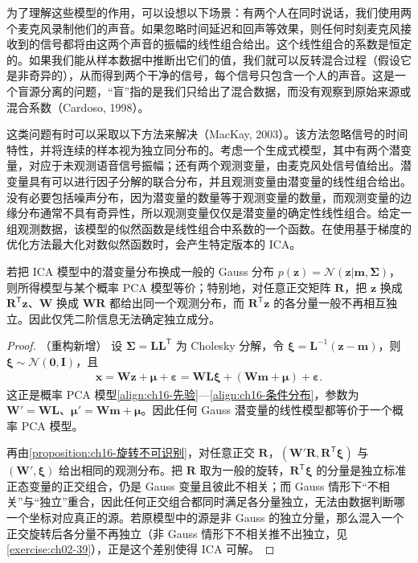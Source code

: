 \documentclass[../../main.tex]{subfiles}
\begin{document}
\begin{example}[ 盲源分离]\label{example:ch16-盲源分离}
为了理解这些模型的作用，可以设想以下场景：有两个人在同时说话，我们使用两个麦克风录制他们的声音。如果忽略时间延迟和回声等效果，则任何时刻麦克风接收到的信号都将由这两个声音的振幅的线性组合给出。这个线性组合的系数是恒定的。如果我们能从样本数据中推断出它们的值，我们就可以反转混合过程（假设它是非奇异的），从而得到两个干净的信号，每个信号只包含一个人的声音。这是一个盲源分离的问题，“盲”指的是我们只给出了混合数据，而没有观察到原始来源或混合系数（Cardoso, 1998）。
\end{example}

这类问题有时可以采取以下方法来解决（MacKay, 2003）。该方法忽略信号的时间特性，并将连续的样本视为独立同分布的。考虑一个生成式模型，其中有两个潜变量，对应于未观测语音信号振幅；还有两个观测变量，由麦克风处信号值给出。潜变量具有可以进行因子分解的联合分布，并且观测变量由潜变量的线性组合给出。没有必要包括噪声分布，因为潜变量的数量等于观测变量的数量，而观测变量的边缘分布通常不具有奇异性，所以观测变量仅仅是潜变量的确定性线性组合。给定一组观测数据，该模型的似然函数是线性组合中系数的一个函数。在使用基于梯度的优化方法最大化对数似然函数时，会产生特定版本的 ICA。

\begin{proposition}\label{proposition:ch16-Gauss不可辨识}
若把 ICA 模型中的潜变量分布换成一般的 Gauss 分布 $p(\bm{z})=\mathcal{N}(\bm{z}|\bm{m},\bm{\Sigma})$，则所得模型与某个概率 PCA 模型等价；特别地，对任意正交矩阵 $\bm{R}$，把 $\bm{z}$ 换成 $\bm{R}^{\mathsf T}\bm{z}$、$\bm{W}$ 换成 $\bm{W}\bm{R}$ 都给出同一个观测分布，而 $\bm{R}^{\mathsf T}\bm{z}$ 的各分量一般不再相互独立。因此仅凭二阶信息无法确定独立成分。
\end{proposition}

\begin{proof}（重构新增）
设 $\bm{\Sigma}=\bm{L}\bm{L}^{\mathsf T}$ 为 Cholesky 分解，令 $\bm{\xi}=\bm{L}^{-1}(\bm{z}-\bm{m})$，则 $\bm{\xi}\sim\mathcal{N}(\bm{0},\bm{I})$，且
\begin{align*}
  \bm{x}=\bm{W}\bm{z}+\bm{\mu}+\bm{\varepsilon}=\bm{W}\bm{L}\bm{\xi}+(\bm{W}\bm{m}+\bm{\mu})+\bm{\varepsilon}.
\end{align*}
这正是概率 PCA 模型\eqref{align:ch16-先验}—\eqref{align:ch16-条件分布}，参数为 $\bm{W}'=\bm{W}\bm{L}$、$\bm{\mu}'=\bm{W}\bm{m}+\bm{\mu}$。因此任何 Gauss 潜变量的线性模型都等价于一个概率 PCA 模型。

再由\cref{proposition:ch16-旋转不可识别}，对任意正交 $\bm{R}$，$(\bm{W}'\bm{R},\bm{R}^{\mathsf T}\bm{\xi})$ 与 $(\bm{W}',\bm{\xi})$ 给出相同的观测分布。把 $\bm{R}$ 取为一般的旋转，$\bm{R}^{\mathsf T}\bm{\xi}$ 的分量是独立标准正态变量的正交组合，仍是 Gauss 变量且彼此不相关；而 Gauss 情形下“不相关”与“独立”重合，因此任何正交组合都同时满足各分量独立，无法由数据判断哪一个坐标对应真正的源。若原模型中的源是非 Gauss 的独立分量，那么混入一个正交旋转后各分量不再独立（非 Gauss 情形下不相关推不出独立，见\cref{exercise:ch02-39}），正是这个差别使得 ICA 可解。
\end{proof}
\end{document}
